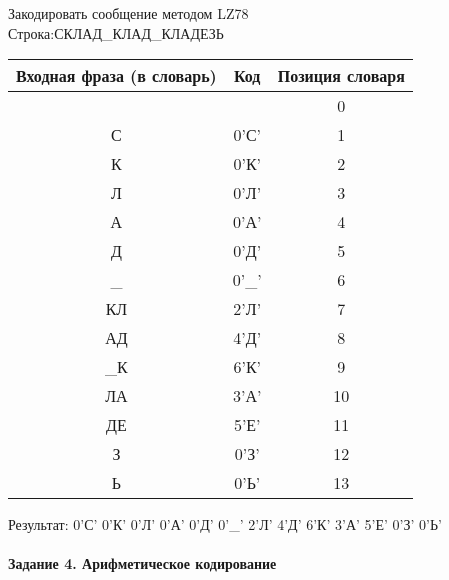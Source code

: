 \documentclass[a4paper, 12pt]{article}
\begin{document}
Закодировать сообщение методом LZ78\\
Строка:СКЛАД\_КЛАД\_КЛАДЕЗЬ\\
\begin{table}[h!]
\centering
\begin{tabular}{|c|c|c|} 
\hline
 Входная фраза (в словарь) & Код & Позиция словаря \\ \hline

 &  & 0 \\ \hline
С & 0'С' & 1 \\ \hline
К & 0'К' & 2 \\ \hline
Л & 0'Л' & 3 \\ \hline
А & 0'А' & 4 \\ \hline
Д & 0'Д' & 5 \\ \hline
\_ & 0'\_' & 6 \\ \hline
КЛ & 2'Л' & 7 \\ \hline
АД & 4'Д' & 8 \\ \hline
\_К & 6'К' & 9 \\ \hline
ЛА & 3'А' & 10 \\ \hline
ДЕ & 5'Е' & 11 \\ \hline
З & 0'З' & 12 \\ \hline
Ь & 0'Ь' & 13 \\ \hline
\end{tabular}
\end{table}

Результат: 0'С' 0'К' 0'Л' 0'А' 0'Д' 0'\_' 2'Л' 4'Д' 6'К' 3'А' 5'Е' 0'З' 0'Ь'\\
\pagebreak
\paragraph{Задание 4. Арифметическое кодирование\\}
\end{document}
